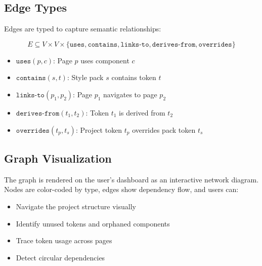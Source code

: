 \documentclass[11pt,twocolumn]{article}
\begin{document}
\subsection{Edge Types}
Edges are typed to capture semantic relationships:

\begin{equation}
  E \subseteq V \times V \times \{
    \texttt{uses}, \texttt{contains}, \texttt{links-to}, \texttt{derives-from}, \texttt{overrides}
  \}
\end{equation}

\begin{itemize}[nosep]
  \item $\texttt{uses}(p, c)$: Page $p$ uses component $c$
  \item $\texttt{contains}(s, t)$: Style pack $s$ contains token $t$
  \item $\texttt{links-to}(p_1, p_2)$: Page $p_1$ navigates to page $p_2$
  \item $\texttt{derives-from}(t_1, t_2)$: Token $t_1$ is derived from $t_2$
  \item $\texttt{overrides}(t_p, t_s)$: Project token $t_p$ overrides pack token $t_s$
\end{itemize}

\subsection{Graph Visualization}
The graph is rendered on the user's dashboard as an interactive network diagram. Nodes are color-coded by type, edges show dependency flow, and users can:
\begin{itemize}[nosep]
  \item Navigate the project structure visually
  \item Identify unused tokens and orphaned components
  \item Trace token usage across pages
  \item Detect circular dependencies
\end{itemize}
\end{document}
